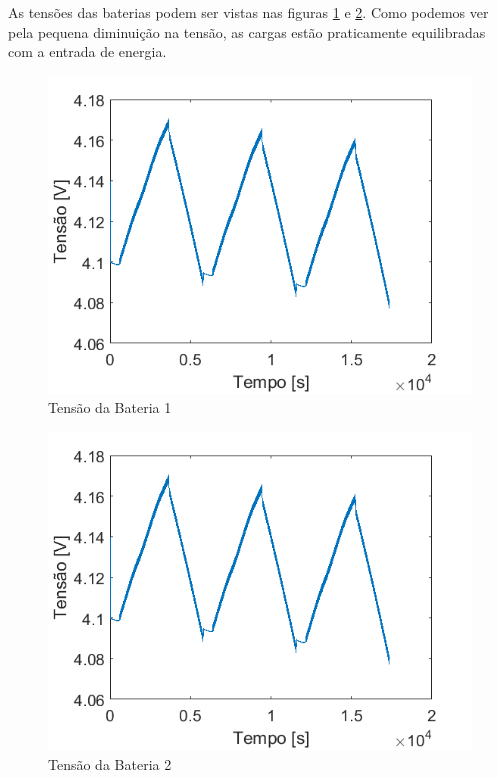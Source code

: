As tensões das baterias podem ser vistas nas figuras \ref{figura_simulacao_tensao_bat1} e \ref{figura_simulacao_tensao_bat2}. Como podemos ver pela pequena diminuição na tensão, as cargas estão praticamente equilibradas com a entrada de energia.

\begin{figure}[!htpb]
\begin{center}
\includegraphics[scale=0.5]{figures/simulatedBatteryVoltage1.png}
\caption{Tensão da Bateria 1}
\label{figura_simulacao_tensao_bat1}
\end{center}
\end{figure}

\begin{figure}[!htpb]
\begin{center}
\includegraphics[scale=0.5]{figures/simulatedBatteryVoltage2.png}
\caption{Tensão da Bateria 2}
\label{figura_simulacao_tensao_bat2}
\end{center}
\end{figure}